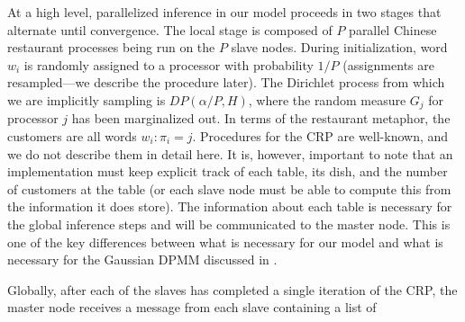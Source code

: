 At a high level, parallelized inference in our model proceeds in two
stages that alternate until convergence. The local stage is composed
of $P$ parallel Chinese restaurant processes being run on the $P$
slave nodes. During initialization, word $w_i$ is randomly assigned to
a processor with probability $1/P$ (assignments are resampled---we
describe the procedure later). The Dirichlet process from which we are
implicitly sampling is $DP(\alpha/P, H)$, where the random measure
$G_j$ for processor $j$ has been marginalized out. In terms of the
restaurant metaphor, the customers are all words $w_i : {\pi_i =
  j}$. Procedures for the CRP are well-known, and we do not describe
them in detail here. It is, however, important to note that an
implementation must keep explicit track of each table, its dish, and
the number of customers at the table (or each slave node must be able
to compute this from the information it does store). The information
about each table is necessary for the global inference steps and will
be communicated to the master node. This is one of the key differences
between what is necessary for our model and what is necessary for the
Gaussian DPMM discussed in \cite{williamson2013}.

Globally, after each of the slaves has completed a single iteration of
the CRP, the master node receives a message from each slave containing
a list of
